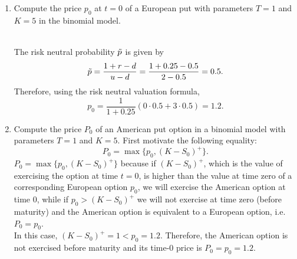 \documentclass[11pt,a4,table]{article}
\begin{document}
\begin{enumerate}
\begin{enumerate}
\newpage
        \item Compute the price $p_0$ at $t=0$ of a European put with parameters $T=1$ and $K=5$ in the binomial model.
        \begin{figure}[hp]
        \end{figure}\\
        The risk neutral probability $\Tilde{p}$ is given by
        \begin{equation*}
            \Tilde{p} = \frac{1+r-d}{u-d} = \frac{1+0.25-0.5}{2-0.5} = 0.5.
        \end{equation*}
        Therefore, using the risk neutral valuation formula,
        \begin{equation*}
            p_0 = \frac{1}{1+0.25}(0\cdot 0.5 + 3\cdot 0.5)=1.2.
        \end{equation*}
        
        \item Compute the price $P_0$ of an American put option in a binomial model with parameters $T=1$ and $K=5$. First motivate the following equality:
        \begin{equation*}
            P_0=\max\{p_0,(K-S_0)^+\}.
        \end{equation*}
        $P_0 = \max\{p_0,(K-S_0)^+\}$ because if $(K-S_0)^+$, which is the value of exercising the option at time $t=0$, is higher than the value at time zero of a corresponding European option $p_0$, we will exercise the American option at time 0, while if $p_0>(K-S_0)^+$ we will not exercise at time zero (before maturity) and the American option is equivalent to a European option, i.e. $P_0 = p_0$.\\
        In this case, $(K-S_0)^+=1<p_0 = 1.2$. Therefore, the American option is not exercised before maturity and its time-0 price is $P_0=p_0=1.2$.
        

\end{enumerate}
\end{enumerate}
\end{document}
